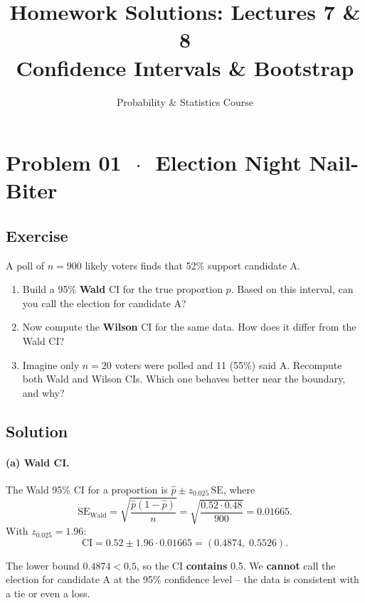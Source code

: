 \documentclass[11pt]{article}
\title{Homework Solutions: Lectures 7 \& 8\\[4pt]
\large Confidence Intervals \& Bootstrap}
\author{Probability \& Statistics Course}
\date{}
\begin{document}
\maketitle

\section*{Problem 01 \texorpdfstring{$\,\cdot\,$}{-} Election Night Nail-Biter}

\subsection*{Exercise}

A poll of $n = 900$ likely voters finds that 52\% support candidate A.

\begin{enumerate}[label=\alph*)]
  \item Build a 95\% \textbf{Wald} CI for the true proportion $p$. Based on this interval, can you call the election for candidate A?
  \item Now compute the \textbf{Wilson} CI for the same data. How does it differ from the Wald CI?
  \item Imagine only $n = 20$ voters were polled and 11 (55\%) said A. Recompute both Wald and Wilson CIs. Which one behaves better near the boundary, and why?
\end{enumerate}

\subsection*{Solution}

\paragraph{(a) Wald CI.}

The Wald 95\% CI for a proportion is $\hat{p} \pm z_{0.025}\,\text{SE}$, where
\[
  \text{SE}_{\text{Wald}} = \sqrt{\frac{\hat{p}(1-\hat{p})}{n}}
  = \sqrt{\frac{0.52 \cdot 0.48}{900}}
  = 0.01665.
\]
With $z_{0.025} = 1.96$:
\[
  \text{CI} = 0.52 \pm 1.96 \cdot 0.01665 = (0.4874,\; 0.5526).
\]

The lower bound $0.4874 < 0.5$, so the CI \textbf{contains} 0.5. We \textbf{cannot} call the election for candidate A at the 95\% confidence level -- the data is consistent with a tie or even a loss.
\end{document}
